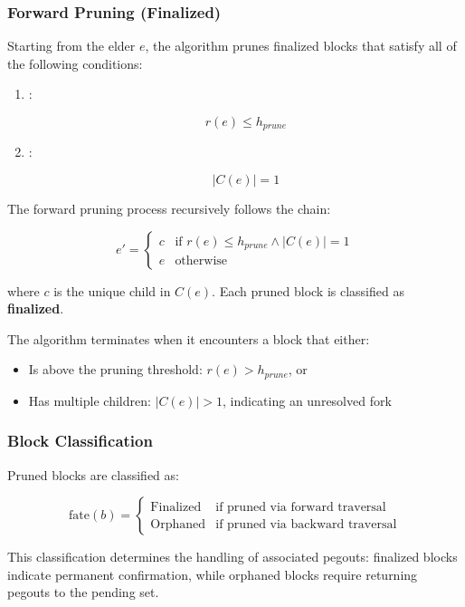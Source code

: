 \subsubsection{Forward Pruning (Finalized)}
\label{sec:fork-forward-pruning}

Starting from the elder $e$, the algorithm prunes finalized blocks that satisfy all of the following conditions:

\begin{enumerate}
    \item {}:
    
    \[r(e) \leq h_{prune}\]
    
    \item {}:
    
    \[|C(e)| = 1\]
\end{enumerate}

The forward pruning process recursively follows the chain:

\begin{equation}
e' = \begin{cases}
c & \text{if } r(e) \leq h_{prune} \land |C(e)| = 1 \\
e & \text{otherwise}
\end{cases}
\end{equation}

where $c$ is the unique child in $C(e)$. Each pruned block is classified as \textbf{finalized}.

The algorithm terminates when it encounters a block that either:

\begin{itemize}
    \item Is above the pruning threshold: $r(e) > h_{prune}$, or
    \item Has multiple children: $|C(e)| > 1$, indicating an unresolved fork
\end{itemize}

\subsubsection{Block Classification}
\label{sec:fork-block-classification}

Pruned blocks are classified as:

\begin{equation}
\text{fate}(b) = \begin{cases}
\text{Finalized} & \text{if pruned via forward traversal} \\
\text{Orphaned} & \text{if pruned via backward traversal}
\end{cases}
\end{equation}

This classification determines the handling of associated pegouts: finalized blocks indicate permanent confirmation, while orphaned blocks require returning pegouts to the pending set.